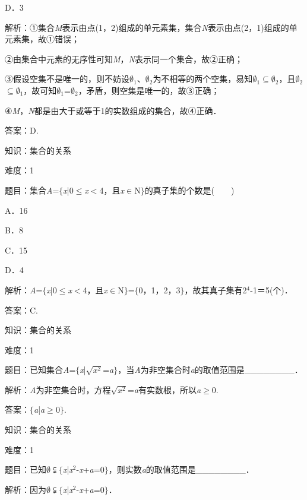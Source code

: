 \documentclass{article} %
\begin{document}
D．3

解析：①集合\textit{M}表示由点(1，2)组成的单元素集，集合\textit{N}表示由点(2，1)组成的单元素集，故①错误；

②由集合中元素的无序性可知\textit{M}，\textit{N}表示同一个集合，故②正确；

③假设空集不是唯一的，则不妨设$\mathrm{\emptyset}$${}_{1}$、$\mathrm{\emptyset}$${}_{2}$为不相等的两个空集，易知$\mathrm{\emptyset}$${}_{1}$$\mathrm{\subseteq}$$\mathrm{\emptyset}$${}_{2}$，且$\mathrm{\emptyset}$${}_{2}$$\mathrm{\subseteq}$$\mathrm{\emptyset}$${}_{1}$，故可知$\mathrm{\emptyset}$${}_{1}$=$\mathrm{\emptyset}$${}_{2}$，矛盾，则空集是唯一的，故③正确；

④\textit{M}，\textit{N}都是由大于或等于1的实数组成的集合，故④正确．

答案：D.

知识：集合的关系

难度：1

题目：集合\textit{A}=$\mathrm{\{}$\textit{x}|0$\mathrm{\le}$\textit{x}$\mathrm{<}$4，且\textit{x}$\mathrm{\in}$N$\mathrm{\}}$的真子集的个数是(　　)

A．16  

B．8  

C．15  

D．4

解析：\textit{A}=$\mathrm{\{}$\textit{x}|0$\mathrm{\le}$\textit{x}$\mathrm{<}$4，且\textit{x}$\mathrm{\in}$N$\mathrm{\}}$=$\mathrm{\{}$0，1，2，3$\mathrm{\}}$，故其真子集有2${}^{4}$-1＝5(个)．

答案：C.

知识：集合的关系

难度：1

题目：已知集合\textit{A}=$\mathrm{\{}$\textit{x}|$\sqrt{x^{2}}$=\textit{a}$\mathrm{\}}$，当\textit{A}为非空集合时\textit{a}的取值范围是\_\_\_\_\_\_\_\_．

解析：\textit{A}为非空集合时，方程$\sqrt{x^{2}}$=\textit{a}有实数根，所以\textit{a}$\mathrm{\ge}$0.

答案：$\mathrm{\{}$\textit{a}|\textit{a}$\mathrm{\ge}$0$\mathrm{\}}$.

知识：集合的关系

难度：1

题目：已知$\emptyset\subsetneqq$$\mathrm{\{}$\textit{x}|\textit{x}${}^{2}$-\textit{x}+\textit{a}=0$\mathrm{\}}$，则实数\textit{a}的取值范围是\_\_\_\_\_\_\_\_．

解析：因为$\emptyset\subsetneqq$$\mathrm{\{}$\textit{x}|\textit{x}${}^{2}$-\textit{x}+\textit{a}=0$\mathrm{\}}$．
\end{document}
